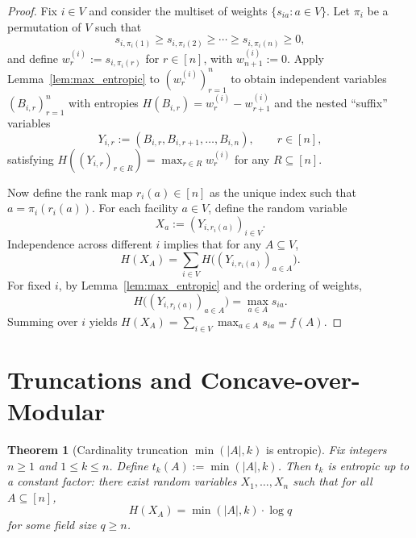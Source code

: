 \documentclass[conference]{IEEEtran}
\newtheorem{theorem}{Theorem}
\theoremstyle{definition}
\theoremstyle{remark}
\begin{document}
\begin{proof}
Fix $i\in V$ and consider the multiset of weights $\{s_{ia}:a\in V\}$. Let $\pi_i$ be a permutation of $V$
such that
\[
s_{i,\pi_i(1)}\ge s_{i,\pi_i(2)}\ge \cdots \ge s_{i,\pi_i(n)}\ge 0,
\]
and define $w^{(i)}_r := s_{i,\pi_i(r)}$ for $r\in[n]$, with $w^{(i)}_{n+1}:=0$. Apply Lemma~\ref{lem:max_entropic}
to $(w^{(i)}_r)_{r=1}^n$ to obtain independent variables $(B_{i,r})_{r=1}^n$ with entropies
$H(B_{i,r})=w^{(i)}_r-w^{(i)}_{r+1}$ and the nested ``suffix'' variables
\[
Y_{i,r}:=(B_{i,r},B_{i,r+1},\dots,B_{i,n}),\qquad r\in[n],
\]
satisfying $H((Y_{i,r})_{r\in R})=\max_{r\in R} w^{(i)}_r$ for any $R\subseteq[n]$.

Now define the rank map $r_i(a)\in[n]$ as the unique index such that $a=\pi_i(r_i(a))$.
For each facility $a\in V$, define the random variable
\[
X_a := (Y_{i,r_i(a)})_{i\in V}.
\]
Independence across different $i$ implies that for any $A\subseteq V$,
\[
H(X_A)=\sum_{i\in V} H\big((Y_{i,r_i(a)})_{a\in A}\big).
\]
For fixed $i$, by Lemma~\ref{lem:max_entropic} and the ordering of weights,
\[
H\big((Y_{i,r_i(a)})_{a\in A}\big) = \max_{a\in A} s_{ia}.
\]
Summing over $i$ yields $H(X_A)=\sum_{i\in V}\max_{a\in A}s_{ia}=f(A)$.
\end{proof}

\section{Truncations and Concave-over-Modular} \label{sec:concavemod}

\begin{theorem}[Cardinality truncation $\min(|A|,k)$ is entropic]
\label{thm:card_trunc_entropic}
Fix integers $n\ge 1$ and $1\le k\le n$. Define $t_k(A):=\min(|A|,k)$.
Then $t_k$ is entropic up to a constant factor: there exist random variables
$X_1,\dots,X_n$ such that for all $A\subseteq[n]$,
\[
H(X_A)=\min(|A|,k)\cdot \log q
\]
for some field size $q\ge n$.
\end{theorem}
\end{document}

